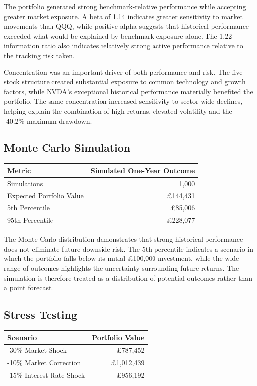 \documentclass[10pt,a4paper]{article}
\begin{document}
The portfolio generated strong benchmark-relative performance while accepting greater market exposure. A beta of 1.14 indicates greater sensitivity to market movements than QQQ, while positive alpha suggests that historical performance exceeded what would be explained by benchmark exposure alone. The 1.22 information ratio also indicates relatively strong active performance relative to the tracking risk taken.

Concentration was an important driver of both performance and risk. The five-stock structure created substantial exposure to common technology and growth factors, while NVDA's exceptional historical performance materially benefited the portfolio. The same concentration increased sensitivity to sector-wide declines, helping explain the combination of high returns, elevated volatility and the -40.2\% maximum drawdown.

\subsection{Monte Carlo Simulation}

\begin{table}[h]
\centering
\small
\begin{tabular}{lr}
\toprule
\textbf{Metric} & \textbf{Simulated One-Year Outcome} \\
\midrule
Simulations & 1,000 \\
Expected Portfolio Value & £144,431 \\
5th Percentile & £85,006 \\
95th Percentile & £228,077 \\
\bottomrule
\end{tabular}
\end{table}

The Monte Carlo distribution demonstrates that strong historical performance does not eliminate future downside risk. The 5th percentile indicates a scenario in which the portfolio falls below its initial £100,000 investment, while the wide range of outcomes highlights the uncertainty surrounding future returns. The simulation is therefore treated as a distribution of potential outcomes rather than a point forecast.

\subsection{Stress Testing}

\begin{table}[h]
\centering
\small
\begin{tabular}{lr}
\toprule
\textbf{Scenario} & \textbf{Portfolio Value} \\
\midrule
-30\% Market Shock & £787,452 \\
-10\% Market Correction & £1,012,439 \\
-15\% Interest-Rate Shock & £956,192 \\
\bottomrule
\end{tabular}
\end{table}
\end{document}
